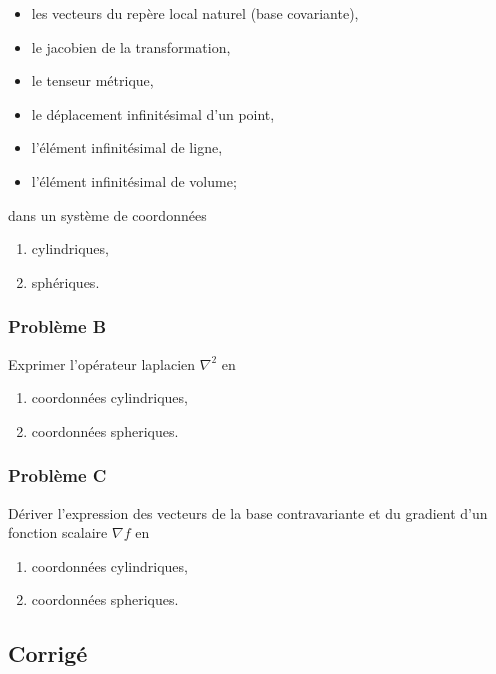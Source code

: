 \documentclass
[
a4paper,                      %
twoside,					  %
12pt,                         %
abstract,		      %
fleqn,                        %
]
{scrartcl} %
\begin{document}
\begin{itemize}
\renewcommand\labelitemi{--}
\item les vecteurs du rep\`ere local naturel (base covariante),
\item le jacobien de la transformation,
\item le tenseur m\'etrique,
\item le d\'eplacement infinit\'esimal d'un point,
\item l'\'el\'ement infinit\'esimal de ligne,
\item l'\'el\'ement infinit\'esimal de volume;
\end{itemize}

dans un syst\`eme de coordonn\'ees

\begin{enumerate}
\item cylindriques,
\item sph\'eriques.
\end{enumerate}

\subsubsection{Probl\`eme B}

Exprimer l'op\'erateur laplacien $\nabla^{2}$ en

\begin{enumerate}
\item coordonn\'ees cylindriques,
\item coordonn\'ees spheriques.
\end{enumerate}

\subsubsection{Probl\`eme C}

D\'eriver l'expression des vecteurs de la base contravariante et du gradient d'un fonction scalaire $\nabla f$ en

\begin{enumerate}
\item coordonn\'ees cylindriques,
\item coordonn\'ees spheriques.
\end{enumerate}

\newpage

\subsection{Corrig\'e}
\end{document}
